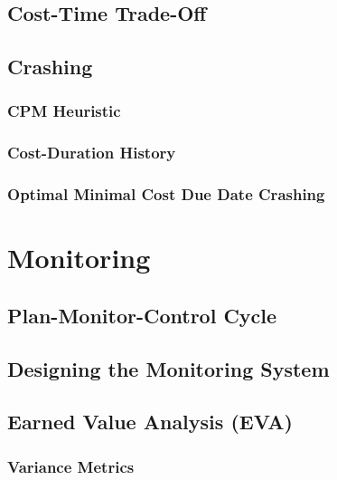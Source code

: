 	\section{Cost-Time Trade-Off} %

	\section{Crashing} %

		\subsection{CPM Heuristic} %

		\subsection{Cost-Duration History} %

		\subsection{Optimal Minimal Cost Due Date Crashing} %

\chapter{Monitoring} %

	\section{Plan-Monitor-Control Cycle} %

	\section{Designing the Monitoring System} %

	\section{Earned Value Analysis (EVA)} %

		\subsection{Variance Metrics} %

